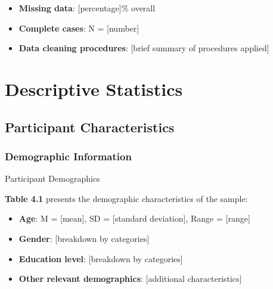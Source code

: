 \documentclass[
  12pt,
  letterpaper,
  12pt,
  letterpaper,
  oneside]{report}
\newenvironment{Shaded}{\begin{snugshade}}{\end{snugshade}}
\newcommand{\CommentTok}[1]{\textcolor[rgb]{0.37,0.37,0.37}{#1}}
\providecommand{\tightlist}{%
  \setlength{\itemsep}{0pt}\setlength{\parskip}{0pt}}
\begin{document}
\begin{itemize}
\tightlist
\item
  \textbf{Missing data}: {[}percentage{]}\% overall
\item
  \textbf{Complete cases}: N = {[}number{]}
\item
  \textbf{Data cleaning procedures}: {[}brief summary of procedures
  applied{]}
\end{itemize}

\section{Descriptive Statistics}\label{descriptive-statistics}

\subsection{Participant
Characteristics}\label{participant-characteristics}

\subsubsection{Demographic Information}\label{demographic-information}

\begin{table}

\caption{\label{tbl-demographics}Participant Demographics}

\centering{

\begin{Shaded}
\begin{Highlighting}[]
\CommentTok{\# Demographic table will be generated here}
\end{Highlighting}
\end{Shaded}

}

\end{table}%

\textbf{Table 4.1} presents the demographic characteristics of the
sample:

\begin{itemize}
\tightlist
\item
  \textbf{Age}: M = {[}mean{]}, SD = {[}standard deviation{]}, Range =
  {[}range{]}
\item
  \textbf{Gender}: {[}breakdown by categories{]}
\item
  \textbf{Education level}: {[}breakdown by categories{]}
\item
  \textbf{Other relevant demographics}: {[}additional characteristics{]}
\end{itemize}
\end{document}
